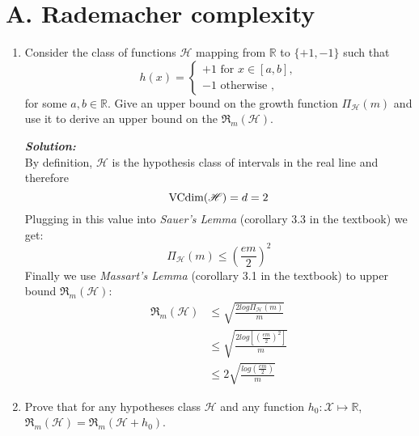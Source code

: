 \documentclass{article}
\def\Rset{\mathbb{R}}
\def\vcdim{\textnormal{VCdim}}
\newcommand{\cH}{{\mathscr H}}
\newcommand{\cX}{{\mathscr X}}
\newcommand{\R}{\mathfrak{R}}
\begin{document}
\section*{A. Rademacher complexity}


\begin{enumerate}
\item Consider the class of functions
  $\cH$ mapping from $\Rset$ to $\{+1, -1\}$ such that
\begin{equation*}
h(x) =
\begin{cases}
               +1 \text{ for } x \in [a, b],\\
               -1 \text{ otherwise },
            \end{cases}
\end{equation*}
for some $a, b \in \Rset$.
Give an upper bound on the growth function $\Pi_{\cH}(m)$ and use it to
derive an upper bound on the $\R_{m}(\cH)$.

\textbf{\emph{Solution:}}\\
By definition, $\cH$ is the hypothesis class of intervals in the real line and therefore 
\begin{equation*}
    \vcdim(\cH) = d = 2
\end{equation*}
Plugging in  this value into \emph{Sauer's Lemma} (corollary 3.3 in the textbook) we get:
\begin{equation*}
    \Pi_{\cH}(m) \leq \left(\frac{em}{2}\right)^2
\end{equation*}
Finally we use \emph{Massart's Lemma} (corollary 3.1 in the textbook) to upper bound $\R_{m}(\cH)$:
\begin{align*}
    \R_{m}(\cH) &\leq \sqrt{\frac{2 log \Pi_{\cH}(m)}{m}}\\
                &\leq \sqrt{\frac{2 log\left[ \left(\frac{em}{2}\right)^2\right]}{m}}\\
                &\leq 2\sqrt{\frac{log\left(\frac{em}{2}\right)}{m}}
\end{align*}

\item Prove that for any hypotheses class $\cH$ and any function
$h_0\colon \cX \mapsto \Rset$, $\R_{m}(\cH) = \R_{m}(\cH + h_0)$.


\end{enumerate}
\end{document}
